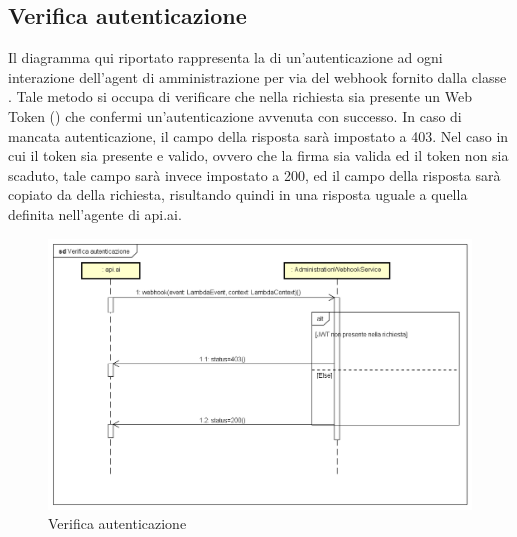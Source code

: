 \subsection{Verifica autenticazione}
Il diagramma qui riportato rappresenta la  di un'autenticazione ad ogni interazione dell'agent di amministrazione per via del webhook fornito dalla classe . Tale metodo si occupa di verificare che nella richiesta sia presente un  Web Token () che confermi un'autenticazione avvenuta con successo. In caso di mancata autenticazione, il campo  della risposta sarà impostato a 403. Nel caso in cui il token sia presente e valido, ovvero che la firma sia valida ed il token non sia scaduto, tale campo sarà invece impostato a 200, ed il campo  della risposta sarà copiato da  della richiesta, risultando quindi in una risposta uguale a quella definita nell'agente di api.ai.
 \begin{figure}[h] \centering \includegraphics[width=\textwidth,height=\textheight,keepaspectratio]{images/diagrams/back-end/Ufficial_Backend/Verificaautenticazione.png} 	\caption{Verifica autenticazione}
\end{figure}
\newpage


